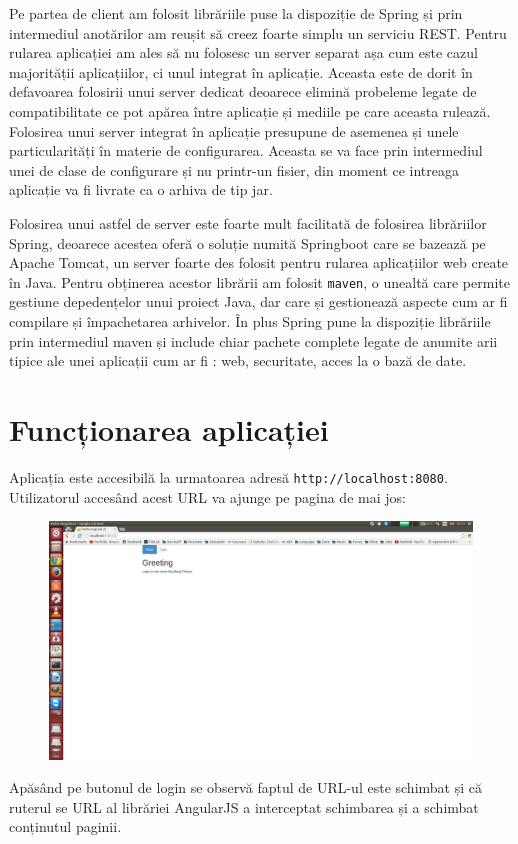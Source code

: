 \documentclass[12pt, a4paper, oneside, romanian]{teza-upb}
\begin{document}
Pe partea de client am folosit librăriile puse la dispoziție de Spring și prin intermediul anotărilor am reușit să creez foarte simplu un serviciu REST. Pentru rularea aplicației am ales să nu folosesc un server separat așa cum este cazul majorității aplicațiilor, ci unul integrat în aplicație. Aceasta este de dorit în defavoarea folosirii unui server dedicat deoarece elimină probeleme legate de compatibilitate ce pot apărea între aplicație și mediile pe care aceasta rulează. Folosirea unui server integrat în aplicație presupune de asemenea și unele particularități în materie de configurarea. Aceasta se va face prin intermediul unei de clase de configurare și nu printr-un fisier, din moment ce intreaga aplicație va fi livrate ca o arhiva de tip jar.

Folosirea unui astfel de server este foarte mult facilitată de folosirea librăriilor Spring, deoarece acestea oferă o soluție numită Springboot care se bazează pe Apache Tomcat, un server foarte des folosit pentru rularea aplicațiilor web create în Java. Pentru obținerea acestor librării am folosit \texttt{maven}, o unealtă care permite gestiune depedențelor unui proiect Java, dar care și gestionează aspecte cum ar fi compilare și împachetarea arhivelor. În plus Spring pune la dispoziție librăriile prin intermediul maven și include chiar pachete complete legate de anumite arii tipice ale unei aplicații cum ar fi : web, securitate, acces la o bază de date.

\chapter{Funcționarea aplicației}
Aplicația este accesibilă la urmatoarea adresă \texttt{http://localhost:8080}. Utilizatorul accesând acest URL va ajunge pe pagina de mai jos: 

\begin{figure}[h]
\centering
\includegraphics*[scale=0.2]{img/poza1.png}
\end{figure}
Apăsând pe butonul de login se observă faptul de URL-ul este schimbat și că ruterul se URL al librăriei AngularJS a interceptat schimbarea și a schimbat conținutul paginii.	
\end{document}
